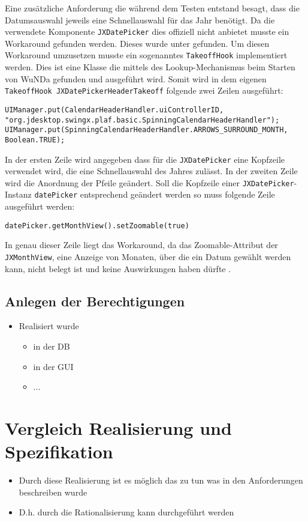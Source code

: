Eine zusätzliche Anforderung die während dem Testen entstand besagt, dass die Datumsauswahl jeweils eine Schnellauswahl für das Jahr benötigt. Da die verwendete Komponente \lstinline|JXDatePicker| dies offiziell nicht anbietet musste ein Workaround gefunden werden. Dieses wurde unter \autocite{so-jxdatepicker} gefunden. Um diesen Workaround umzusetzen musste ein sogenanntes \lstinline|TakeoffHook| implementiert werden. Dies ist eine Klasse die mittels des Lookup-Mechanismus beim Starten von \ac{WuNDa} gefunden und ausgeführt wird. Somit wird in dem eigenen \lstinline|TakeoffHook JXDatePickerHeaderTakeoff| folgende zwei Zeilen ausgeführt:
\begin{lstlisting}
UIManager.put(CalendarHeaderHandler.uiControllerID, "org.jdesktop.swingx.plaf.basic.SpinningCalendarHeaderHandler");
UIManager.put(SpinningCalendarHeaderHandler.ARROWS_SURROUND_MONTH, Boolean.TRUE);
\end{lstlisting}
In der ersten Zeile wird angegeben dass für die \lstinline|JXDatePicker| eine Kopfzeile verwendet wird, die eine Schnellauswahl des Jahres zulässt. In der zweiten Zeile wird die Anordnung der Pfeile geändert. Soll die Kopfzeile einer \lstinline|JXDatePicker|-Instanz \lstinline|datePicker| entsprechend geändert werden so muss folgende Zeile ausgeführt werden:
\begin{lstlisting}
datePicker.getMonthView().setZoomable(true)
\end{lstlisting}
In genau dieser Zeile liegt das Workaround, da das Zoomable-Attribut der \lstinline|JXMonthView|, eine Anzeige von Monaten, über die ein Datum gewählt werden kann, nicht belegt ist und keine Auswirkungen haben dürfte \autocite[vgl.][]{swingx-jxdatepicker}. 

\subsection{Anlegen der Berechtigungen}


\begin{itemize}
	\item Realisiert wurde
	\begin{itemize}
		\item in der DB
		\item in der GUI
		\item ...
	\end{itemize}
\end{itemize}


\section{Vergleich Realisierung und Spezifikation}
\begin{itemize}
	\item Durch diese Realisierung ist es möglich das zu tun was in den Anforderungen beschreiben wurde
	\item D.h. durch die Rationalisierung kann durchgeführt werden
\end{itemize}